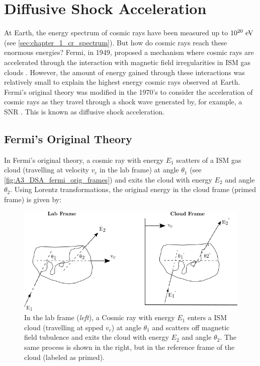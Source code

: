 \chapter{Diffusive Shock Acceleration} \label{A3_DSA}

At Earth, the energy spectrum of cosmic rays have been measured up to $10^{20}~\si{\electronvolt}$ (see \autoref{sec:chapter_1_cr_spectrum}). But how do cosmic rays reach these enormous energies? Fermi, in 1949, proposed a mechanism where cosmic rays are accelerated through the interaction with magnetic field irregularities in ISM gas clouds \citep{1949PhRv...75.1169F}. However, the amount of energy gained through these interactions was relatively small to explain the highest energy cosmic rays observed at Earth. Fermi's original theory was modified in the 1970's to consider the acceleration of cosmic rays as they travel through a shock wave generated by, for example, a SNR \citep{1977DoSSR.234.1306K,1977ICRC...11..132A,1978MNRAS.182..147B,1978MNRAS.182..443B,1978ApJ...221L..29B}. This is known as diffusive shock acceleration.

\section{Fermi's Original Theory}

In Fermi's original theory, a cosmic ray with energy $E_1$  scatters of a ISM gas cloud (travelling at velocity $v_c$ in the lab frame) at angle $\theta_1$ (see \autoref{fig:A3_DSA_fermi_orig_frames}) and exits the cloud with energy $E_2$ and angle $\theta_2$. Using Lorentz transformations, the original energy in the cloud frame (primed frame) is given by:

\begin{figure}[h!]
    \centering
    \includegraphics{A3_Diffusive_Shock_Acceleration/Images/fermi_original_theory_frames.png}
    \caption{In the lab frame (\textit{left}), a Cosmic ray with energy $E_1$ enters a ISM cloud (travelling at spped $v_c$) at angle $\theta_1$ and scatters off magnetic field tubulence and exits the cloud with energy $E_2$ and angle $\theta_2$. The same process is shown in the right, but in the reference frame of the cloud (labeled as primed).}
    \label{fig:A3_DSA_fermi_orig_frames}
\end{figure}

